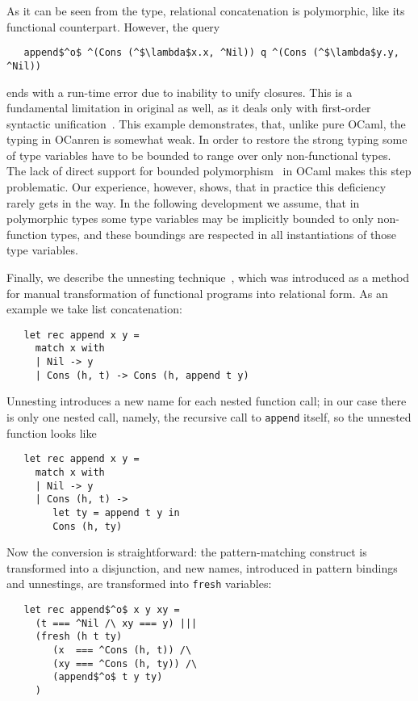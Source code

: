 As it can be seen from the type, relational concatenation is polymorphic, like its functional counterpart. However, the query

\begin{lstlisting}
   append$^o$ ^(Cons (^$\lambda$x.x, ^Nil)) q ^(Cons (^$\lambda$y.y, ^Nil))  
\end{lstlisting}

\noindent ends with a run-time error due to inability to unify closures. This is a fundamental limitation in original \miniKanren as well, as it deals only with first-order syntactic unification~\cite{Unification}. This example demonstrates, that, unlike pure OCaml, the typing in OCanren is somewhat weak. In order to restore the strong typing some of type variables have to be bounded to range over only non-functional types. The lack of direct support for bounded polymorphism~\cite{cardelli} in OCaml makes this step problematic. Our experience, however, shows, that in practice this deficiency rarely gets in the way. In the following development we assume, that in polymorphic types some type variables may be implicitly bounded to only non-function types, and these boundings are respected in all instantiations of those type variables.

Finally, we describe the unnesting technique~\cite{TRS}, which was introduced as a method for manual transformation
of functional programs into relational form. As an example we take list concatenation:

\begin{lstlisting}
   let rec append x y =
     match x with
     | Nil -> y
     | Cons (h, t) -> Cons (h, append t y)
\end{lstlisting}

Unnesting introduces a new name for each nested function call; in our case there is only one nested call, namely,
the recursive call to \lstinline|append| itself, so the unnested function looks like

\begin{lstlisting}
   let rec append x y =
     match x with 
     | Nil -> y
     | Cons (h, t) -> 
        let ty = append t y in
        Cons (h, ty)
\end{lstlisting}

Now the conversion is straightforward: the pattern-matching construct is transformed into a disjunction, and new names,
introduced in pattern bindings and unnestings, are transformed into \lstinline|fresh| variables:

\begin{lstlisting}
   let rec append$^o$ x y xy =
     (t === ^Nil /\ xy === y) |||
     (fresh (h t ty)
        (x  === ^Cons (h, t)) /\
        (xy === ^Cons (h, ty)) /\
        (append$^o$ t y ty)
     )
\end{lstlisting}

